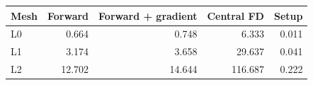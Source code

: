 \begin{tabular}{lrrrr}\toprule
Mesh & Forward & Forward + gradient & Central FD & Setup\\\midrule
L0 & 0.664 & 0.748 & 6.333 & 0.011 \\
L1 & 3.174 & 3.658 & 29.637 & 0.041 \\
L2 & 12.702 & 14.644 & 116.687 & 0.222 \\
\bottomrule\end{tabular}
